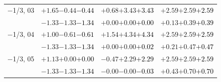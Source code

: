 \documentclass[compress]{beamer}
\begin{document}
\begin{frame}
\begin{tabular}{r | c | c | c}
$-$1/3, 03 & $+1.65$\hspace{0.1 cm}$-0.44$\hspace{0.1 cm}\textcolor{black}{$-0.44$} & $+0.68$\hspace{0.1 cm}$+3.43$\hspace{0.1 cm}\textcolor{black}{$+3.43$} & $+2.59$\hspace{0.1 cm}$+2.59$\hspace{0.1 cm}\textcolor{black}{$+2.59$} \\
           & $-1.33$\hspace{0.1 cm}$-1.33$\hspace{0.1 cm}\textcolor{black}{$-1.34$} & $+0.00$\hspace{0.1 cm}$+0.00$\hspace{0.1 cm}\textcolor{black}{$+0.00$} & $+0.13$\hspace{0.1 cm}$+0.39$\hspace{0.1 cm}\textcolor{black}{$+0.39$} \\
$-$1/3, 04 & $+1.00$\hspace{0.1 cm}$-0.61$\hspace{0.1 cm}\textcolor{black}{$-0.61$} & $+1.54$\hspace{0.1 cm}$+4.34$\hspace{0.1 cm}\textcolor{black}{$+4.34$} & $+2.59$\hspace{0.1 cm}$+2.59$\hspace{0.1 cm}\textcolor{black}{$+2.59$} \\
           & $-1.33$\hspace{0.1 cm}$-1.33$\hspace{0.1 cm}\textcolor{black}{$-1.34$} & $+0.00$\hspace{0.1 cm}$+0.00$\hspace{0.1 cm}\textcolor{black}{$+0.02$} & $+0.21$\hspace{0.1 cm}$+0.47$\hspace{0.1 cm}\textcolor{black}{$+0.47$} \\
$-$1/3, 05 & $+1.13$\hspace{0.1 cm}$+0.00$\hspace{0.1 cm}\textcolor{black}{$+0.00$} & $-0.47$\hspace{0.1 cm}$+2.29$\hspace{0.1 cm}\textcolor{black}{$+2.29$} & $+2.59$\hspace{0.1 cm}$+2.59$\hspace{0.1 cm}\textcolor{black}{$+2.59$} \\
           & $-1.33$\hspace{0.1 cm}$-1.33$\hspace{0.1 cm}\textcolor{black}{$-1.34$} & $-0.00$\hspace{0.1 cm}$-0.00$\hspace{0.1 cm}\textcolor{black}{$-0.03$} & $+0.43$\hspace{0.1 cm}$+0.70$\hspace{0.1 cm}\textcolor{black}{$+0.70$} \\

\end{tabular}
\end{frame}
\end{document}
